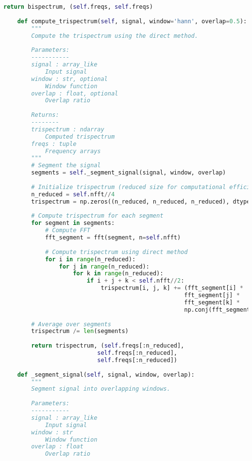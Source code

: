 \begin{lstlisting}[language=Python, caption=HOSAnalyzer class for higher-order spectral analysis]
        return bispectrum, (self.freqs, self.freqs)
    
    def compute_trispectrum(self, signal, window='hann', overlap=0.5):
        """
        Compute the trispectrum using the direct method.
        
        Parameters:
        -----------
        signal : array_like
            Input signal
        window : str, optional
            Window function
        overlap : float, optional
            Overlap ratio
            
        Returns:
        --------
        trispectrum : ndarray
            Computed trispectrum
        freqs : tuple
            Frequency arrays
        """
        # Segment the signal
        segments = self._segment_signal(signal, window, overlap)
        
        # Initialize trispectrum (reduced size for computational efficiency)
        n_reduced = self.nfft//4
        trispectrum = np.zeros((n_reduced, n_reduced, n_reduced), dtype=complex)
        
        # Compute trispectrum for each segment
        for segment in segments:
            # Compute FFT
            fft_segment = fft(segment, n=self.nfft)
            
            # Compute trispectrum using direct method
            for i in range(n_reduced):
                for j in range(n_reduced):
                    for k in range(n_reduced):
                        if i + j + k < self.nfft//2:
                            trispectrum[i, j, k] += (fft_segment[i] * 
                                                    fft_segment[j] * 
                                                    fft_segment[k] * 
                                                    np.conj(fft_segment[i + j + k]))
        
        # Average over segments
        trispectrum /= len(segments)
        
        return trispectrum, (self.freqs[:n_reduced], 
                           self.freqs[:n_reduced], 
                           self.freqs[:n_reduced])
    
    def _segment_signal(self, signal, window, overlap):
        """
        Segment signal into overlapping windows.
        
        Parameters:
        -----------
        signal : array_like
            Input signal
        window : str
            Window function
        overlap : float
            Overlap ratio
            

\end{lstlisting}
